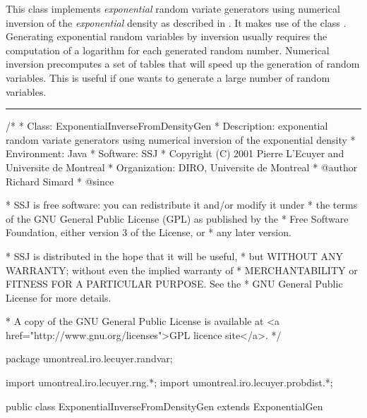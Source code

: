 
This class implements \emph{exponential} random variate generators
 using numerical inversion of the \emph{exponential} density
as described in \cite{rDER10a}. It makes use of the class
.
Generating exponential random variables by inversion usually requires
the computation of a logarithm for each generated random number.
Numerical inversion precomputes a set of tables that will speed up the
generation of random variables. This is useful if one 
wants to generate a large number of random variables.


\bigskip\hrule

\begin{code}
\begin{hide}
/*
 * Class:        ExponentialInverseFromDensityGen
 * Description:  exponential random variate generators using numerical
                 inversion of the exponential density
 * Environment:  Java
 * Software:     SSJ 
 * Copyright (C) 2001  Pierre L'Ecuyer and Universite de Montreal
 * Organization: DIRO, Universite de Montreal
 * @author       Richard Simard
 * @since

 * SSJ is free software: you can redistribute it and/or modify it under
 * the terms of the GNU General Public License (GPL) as published by the
 * Free Software Foundation, either version 3 of the License, or
 * any later version.

 * SSJ is distributed in the hope that it will be useful,
 * but WITHOUT ANY WARRANTY; without even the implied warranty of
 * MERCHANTABILITY or FITNESS FOR A PARTICULAR PURPOSE.  See the
 * GNU General Public License for more details.

 * A copy of the GNU General Public License is available at
   <a href="http://www.gnu.org/licenses">GPL licence site</a>.
 */
\end{hide}
package umontreal.iro.lecuyer.randvar;\begin{hide}
import umontreal.iro.lecuyer.rng.*;
import umontreal.iro.lecuyer.probdist.*;
\end{hide}

public class ExponentialInverseFromDensityGen extends ExponentialGen \begin{hide} {

\end{hide}\end{code}

